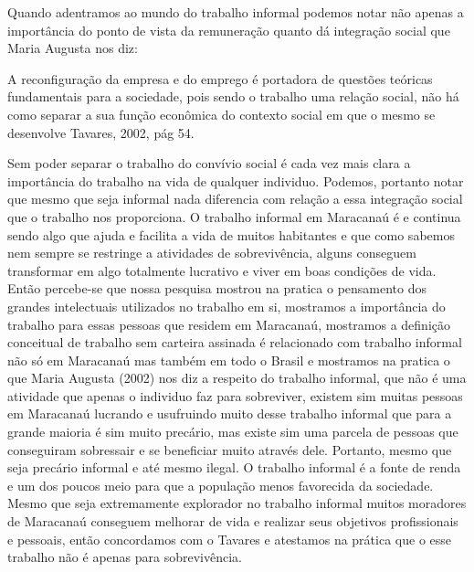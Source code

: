 Quando adentramos ao mundo do trabalho informal podemos notar não apenas a 
importância do ponto de vista da remuneração quanto dá integração social que 
Maria Augusta nos diz:

\begin{citacao}
A reconfiguração da empresa e do emprego é portadora de questões teóricas 
fundamentais para a sociedade, pois sendo o trabalho uma relação social, não há 
como separar a sua função econômica do contexto social em que o mesmo se 
desenvolve Tavares, 2002, pág 54.
\end{citacao}

Sem poder separar o trabalho do convívio social é cada vez mais clara a 
importância do trabalho na vida de qualquer individuo. Podemos, portanto notar 
que mesmo que seja informal nada diferencia com relação a essa integração social 
que o trabalho nos proporciona.
O trabalho informal em Maracanaú é e continua sendo algo que ajuda e facilita a 
vida de muitos habitantes e que como sabemos nem sempre se restringe a 
atividades de sobrevivência, alguns conseguem transformar em algo totalmente 
lucrativo e viver em boas condições de vida. Então percebe-se que nossa pesquisa 
mostrou na pratica o pensamento dos grandes intelectuais utilizados no trabalho 
em si, mostramos a importância do trabalho para essas pessoas que residem em 
Maracanaú, mostramos a definição conceitual de trabalho sem carteira assinada é 
relacionado com trabalho informal não só em Maracanaú mas também em todo o 
Brasil e mostramos na pratica o que Maria Augusta (2002)  nos diz a respeito do 
trabalho informal, que não é uma atividade que apenas o individuo faz para 
sobreviver, existem sim muitas pessoas em Maracanaú lucrando e usufruindo muito 
desse trabalho informal que para a grande maioria é sim muito precário, mas 
existe sim uma parcela de pessoas que conseguiram sobressair e se beneficiar 
muito através dele. 
Portanto, mesmo que seja precário informal e até mesmo ilegal. O trabalho 
informal é a fonte de renda e um dos poucos meio para que a população menos 
favorecida da sociedade. Mesmo que seja extremamente explorador no trabalho 
informal muitos moradores de Maracanaú conseguem melhorar de vida e realizar 
seus objetivos profissionais e pessoais, então concordamos com o Tavares e 
atestamos na prática que o esse trabalho não é apenas para sobrevivência. 
